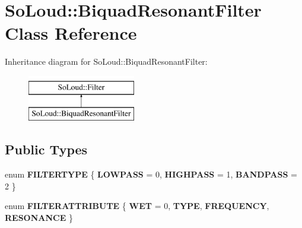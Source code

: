 \hypertarget{class_so_loud_1_1_biquad_resonant_filter}{}\section{So\+Loud\+::Biquad\+Resonant\+Filter Class Reference}
\label{class_so_loud_1_1_biquad_resonant_filter}
Inheritance diagram for So\+Loud\+::Biquad\+Resonant\+Filter\+:\begin{figure}[H]
\begin{center}
\leavevmode
\includegraphics[height=2.000000cm]{class_so_loud_1_1_biquad_resonant_filter}
\end{center}
\end{figure}
\subsection*{Public Types}
\begin{DoxyCompactItemize}
\item 
\mbox{\label{class_so_loud_1_1_biquad_resonant_filter_a0f24bc97c3d6f6eb215be8e44c484071}} 
enum {\bfseries F\+I\+L\+T\+E\+R\+T\+Y\+PE} \{ {\bfseries L\+O\+W\+P\+A\+SS} = 0, 
{\bfseries H\+I\+G\+H\+P\+A\+SS} = 1, 
{\bfseries B\+A\+N\+D\+P\+A\+SS} = 2
 \}
\item 
\mbox{\label{class_so_loud_1_1_biquad_resonant_filter_a50ed3775c10fd396de47dfd0df63f09d}} 
enum {\bfseries F\+I\+L\+T\+E\+R\+A\+T\+T\+R\+I\+B\+U\+TE} \{ {\bfseries W\+ET} = 0, 
{\bfseries T\+Y\+PE}, 
{\bfseries F\+R\+E\+Q\+U\+E\+N\+CY}, 
{\bfseries R\+E\+S\+O\+N\+A\+N\+CE}
 \}
\end{DoxyCompactItemize}
